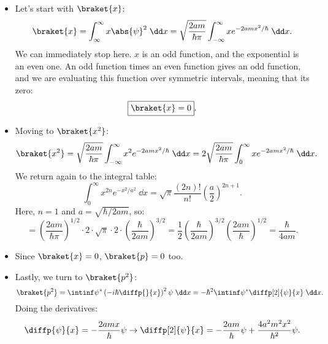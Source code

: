 \begin{example}
    \begin{itemize}
        \item Let's start with $\braket{x}$:
            \begin{equation}
                \braket{x} = \int_{\infty}^{\infty} x\abs{\psi}^2 \;\dd x = \sqrt{\frac{2am}{\hbar\pi}} \int_{-\infty}^{\infty} xe^{-2amx^2/\hbar} \;\dd x.
            \end{equation}
            We can immediately stop here. $x$ is an odd function, and the exponential is an even one. An odd function times an even function gives an odd function, and we are evaluating this function over symmetric intervals, meaning that its zero:
            \begin{equation}
                \boxed{\braket{x} = 0}.
            \end{equation}
        \item Moving to $\braket{x^2}$:
            \begin{equation*}
                \braket{x^2} = \sqrt{\frac{2am}{\hbar\pi}} \int_{-\infty}^{\infty} x^2 e^{-2amx^2/\hbar} \;\dd x = 2\sqrt{\frac{2am}{\hbar\pi}} \int_0^{\infty} xe^{-2amx^2/\hbar} \;\dd x.
            \end{equation*}
            We return again to the integral table:
            \begin{equation}
                \int_0^{\infty} x^{2n} e^{-x^2/a^2} \;\dd x = \sqrt{\pi} \frac{(2n)!}{n!} \left(\frac{a}{2}\right)^{2n+1}.
            \end{equation}
            Here, $n=1$ and $a=\sqrt{\hbar/2am}$, so:
            \begin{equation*}
                = \left(\frac{2am}{\hbar\pi}\right)^{1/2} \cdot 2 \cdot \sqrt{\pi} \cdot 2 \cdot \left(\frac{\hbar}{2am}\right)^{3/2} = \frac{1}{2}\left(\frac{\hbar}{2am}\right)^{3/2}\left(\frac{2am}{\hbar}\right)^{1/2} = \boxed{\frac{\hbar}{4am}}.
            \end{equation*}
        \item Since $\braket{x} = 0$, $\braket{p} = 0$ too.
        \item Lastly, we turn to $\braket{p^2}$:
            \begin{equation*}
                \braket{p^2} = \intinf \psi^* \left(-i\hbar \diffp{}{x}\right)^2 \psi \;\dd x = -\hbar^2 \intinf \psi^* \diffp[2]{\psi}{x} \;\dd x.
            \end{equation*}
            Doing the derivatives:
            \begin{equation*}
                \diffp{\psi}{x} = -\frac{2amx}{\hbar}\psi \rightarrow \diffp[2]{\psi}{x} = -\frac{2am}{\hbar}\psi + \frac{4a^2m^2x^2}{\hbar^2}\psi.

\end{equation*}
\end{itemize}
\end{example}
